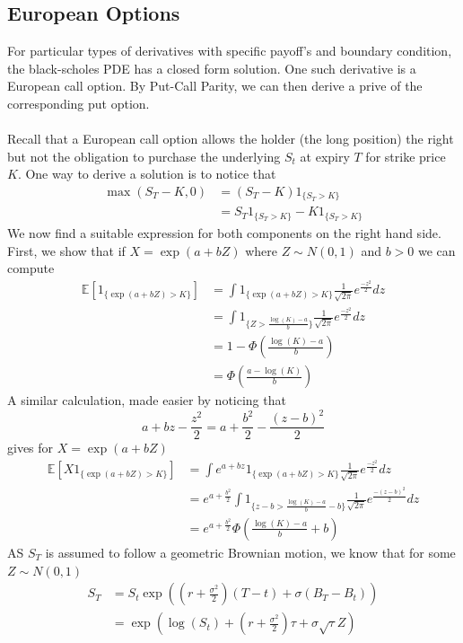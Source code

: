\documentclass{article}
\begin{document}
\subsection{European Options}
For particular types of derivatives with specific payoff's and boundary condition, the black-scholes PDE has a closed form solution. One such derivative is a European call option. By Put-Call Parity, we can then derive a prive of the corresponding put option.\\ 
\\
Recall that a European call option allows the holder (the long position) the right but not the obligation to purchase the underlying $S_t$ at expiry $T$ for strike price $K$. One way to derive a solution is to notice that 
\begin{align*}
    \max(S_T-K, 0) &= (S_T-K)1_{\{S_T>K\}} \\
    &= S_T 1_{\{S_T>K\}} - K 1_{\{S_T>K\}}
\end{align*}
We now find a suitable expression for both components on the right hand side. First, we show that if $X = \exp{(a+bZ)}$ where $Z\sim N(0,1)$ and $b>0$ we can compute
\begin{align*}
    \mathbb{E}[1_{\{ \exp{(a+bZ)>K}\}} ] &=  \int  1_{\{ \exp{(a+bZ)>K}\}} \frac{1}{\sqrt{2\pi}}e^{\frac{-z^2}{2}}dz \\
    &=  \int  1_{\{ {Z>\frac{\log(K)-a}{b}}\}} \frac{1}{\sqrt{2\pi}}e^{\frac{-z^2}{2}}dz \\
    &= 1 - \Phi\left(\frac{\log(K)-a}{b}\right) \\
    &= \Phi\left(\frac{a-\log(K)}{b}\right)
\end{align*}
A similar calculation, made easier by noticing that 
$$a+bz - \frac{z^2}{2} = a+\frac{b^2}{2}-\frac{(z-b)^2}{2}$$
gives for $X = \exp{(a+bZ)}$
\begin{align*}
    \mathbb{E}[X1_{\{ \exp{(a+bZ)>K}\}} ] &= \int e^{a+bz} 1_{\{ \exp{(a+bZ)>K}\}} \frac{1}{\sqrt{2\pi}}e^{\frac{-z^2}{2}}dz \\
    &= e^{a+\frac{b^2}{2}}\int 1_{\{ z-b> \frac{\log(K)-a}{b}-b\}} \frac{1}{\sqrt{2\pi}}e^{\frac{-(z-b)^2}{2}}dz \\
    &= e^{a+\frac{b^2}{2}}\Phi\left( \frac{\log(K)-a}{b}+b\right)
\end{align*}
AS $S_T$ is assumed to follow a geometric Brownian motion, we know that for some $Z\sim N(0,1)$
\begin{align*}
    S_T &= S_t \exp\left(\left( r+\frac{\sigma^2}{2}\right)(T-t) + \sigma(B_T - B_t) \right) \\
    &= \exp\left(\log(S_t) + \left( r+\frac{\sigma^2}{2}\right)\tau + \sigma\sqrt{\tau}Z \right)
\end{align*}
\end{document}
